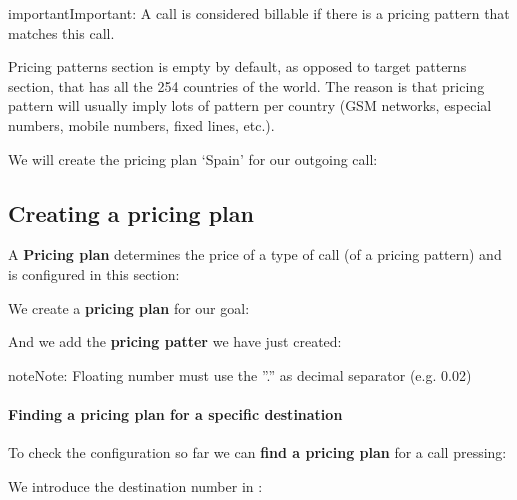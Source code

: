 \documentclass[letterpaper,10pt,english]{sphinxmanual}
\begin{document}
\begin{notice}{important}{Important:}
A call is considered billable if there is a pricing pattern that
matches this call.
\end{notice}

Pricing patterns section is empty by default, as opposed to target patterns section,
that has all the 254 countries of the world. The reason is that pricing pattern
will usually imply lots of pattern per country (GSM networks, especial numbers,
mobile numbers, fixed lines, etc.).

We will create the pricing plan `Spain' for our outgoing call:

\noindent{}


\subsection{Creating a pricing plan}
\label{external_outgoing_calls/noplan_nocall:price-plan}\label{external_outgoing_calls/noplan_nocall:creating-a-pricing-plan}
A \textbf{Pricing plan} determines the price of a type of call (of a pricing pattern)
and is configured in this section:

\noindent{}

We create a \textbf{pricing plan} for our goal:

\noindent{}

And we add the \textbf{pricing patter} we have just created:

\noindent{}

\noindent{}

\begin{notice}{note}{Note:}
Floating number must use the ''.'' as decimal separator (e.g. 0.02)
\end{notice}
\paragraph{Finding a pricing plan for a specific destination}

To check the configuration so far we can \textbf{find a pricing plan} for a call
pressing:

\noindent{}

We introduce the destination number in {\hyperref[external_incoming_calls/numeric_transformations:e164]{}}:
\end{document}
